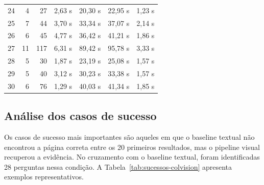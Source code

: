\begin{table}[htbp]
{\begin{tabular}{r r r r r r r}
24 & 4 & 27 & 2,63 s & 20,30 s & 22,95 s & 1,23 s \\
25 & 7 & 44 & 3,70 s & 33,34 s & 37,07 s & 2,14 s \\
26 & 6 & 45 & 4,77 s & 36,42 s & 41,21 s & 1,86 s \\
27 & 11 & 117 & 6,31 s & 89,42 s & 95,78 s & 3,33 s \\
28 & 5 & 30 & 1,87 s & 23,19 s & 25,08 s & 1,57 s \\
29 & 5 & 40 & 3,12 s & 30,23 s & 33,38 s & 1,57 s \\
30 & 6 & 76 & 1,29 s & 40,03 s & 41,34 s & 1,85 s \\
\bottomrule
\end{tabular}
}
\end{table}

\subsection{Análise dos casos de sucesso}
\label{subsec:colvision-casos-sucesso}

Os casos de sucesso mais importantes são aqueles em que o baseline textual não encontrou a página correta entre os 20 primeiros resultados, mas o pipeline visual recuperou a evidência. No cruzamento com o baseline textual, foram identificadas 28 perguntas nessa condição. A Tabela~\ref{tab:sucessos-colvision} apresenta exemplos representativos.

\begin{table}[htbp]
\centering
\caption{Exemplos de perguntas em que o ColQwen3.5 recuperou evidências não encontradas pelo baseline textual.}
\label{tab:sucessos-colvision}
\scriptsize
{}
\end{table}

